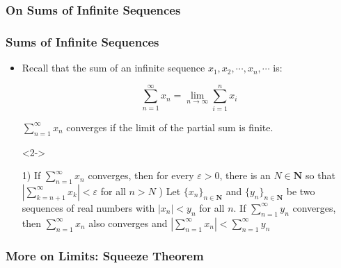 \documentclass[handout]{beamer}
\begin{document}
\subsubsection{On Sums of Infinite Sequences}

\frame
{
  \frametitle{Sums of Infinite Sequences}

   \begin{itemize}
  \item <1-> Recall that the sum of an infinite sequence $x_1,x_2,\cdots,x_n,\cdots $ is:
  
  $$\sum_{n=1}^{\infty} x_n=\lim_{n\rightarrow\infty} \sum_{i=1}^n x_i $$
  
 $\sum_{n=1}^{\infty} x_n$ converges if the limit of the partial sum is finite. 
 
  
   \item[]<2-> \begin{Theorem} 1) If $\sum_{n=1}^{\infty} x_n$ converges, then for every $\varepsilon>0$, there is an $N\in \mathbf{N}$ so that $|\sum_{k=n+1}^{\infty} x_k|<\varepsilon$ for all $n>N$ ) Let $\{x_{n}\}_{n\in \mathbf{N}}$ and $\{y_{n}\}_{n\in \mathbf{N}}$ be two sequences of real numbers with $|x_n|<y_n$ for all $n$. If $\sum_{n=1}^{\infty} y_n$ converges, then $\sum_{n=1}^{\infty} x_n$ also converges and $|\sum_{n=1}^{\infty} x_n|<\sum_{n=1}^{\infty} y_n$ \end{Theorem} 
      
       
  \end{itemize}
}


\subsubsection{More on Limits: Squeeze Theorem}
\end{document}
